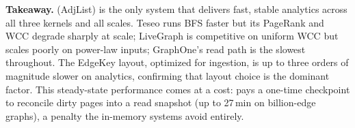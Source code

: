 \textbf{Takeaway.}
\project{} (AdjList) is the only system that delivers fast, stable analytics across all three kernels and all scales.
Teseo runs BFS faster but its PageRank and WCC degrade sharply at scale; LiveGraph is competitive on uniform WCC but scales poorly on power-law inputs; GraphOne's read path is the slowest throughout.
The EdgeKey layout, optimized for ingestion, is up to three orders of magnitude slower on analytics, confirming that layout choice is the dominant factor.
This steady-state performance comes at a cost: \project{} pays a one-time checkpoint to reconcile dirty pages into a read snapshot (up to 27\,min on billion-edge graphs), a penalty the in-memory systems avoid entirely.